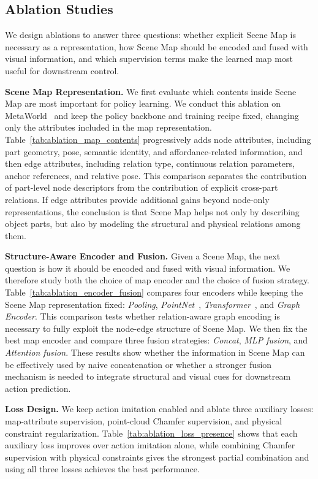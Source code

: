\subsection{Ablation Studies}
\label{sec:ablation_studies}





We design ablations to answer three questions: whether explicit Scene Map is necessary as a representation, how Scene Map should be encoded and fused with visual information, and which supervision terms make the learned map most useful for downstream control.

\textbf{Scene Map Representation.}
We first evaluate which contents inside Scene Map are most important for policy learning. We conduct this ablation on MetaWorld~\cite{Yu2020Meta,mclean2025metaworld} and keep the policy backbone and training recipe fixed, changing only the attributes included in the map representation. Table~\ref{tab:ablation_map_contents} progressively adds node attributes, including part geometry, pose, semantic identity, and affordance-related information, and then edge attributes, including relation type, continuous relation parameters, anchor references, and relative pose. This comparison separates the contribution of part-level node descriptors from the contribution of explicit cross-part relations. If edge attributes provide additional gains beyond node-only representations, the conclusion is that Scene Map helps not only by describing object parts, but also by modeling the structural and physical relations among them.



\textbf{Structure-Aware Encoder and Fusion.}
Given a Scene Map, the next question is how it should be encoded and fused with visual information. We therefore study both the choice of map encoder and the choice of fusion strategy. Table~\ref{tab:ablation_encoder_fusion} compares four encoders while keeping the Scene Map representation fixed: \textit{Pooling}, \textit{PointNet}~\cite{Qi2017PointNet}, \textit{Transformer}~\cite{Kim2021Transformer}, and \textit{Graph Encoder}. This comparison tests whether relation-aware graph encoding is necessary to fully exploit the node-edge structure of Scene Map. We then fix the best map encoder and compare three fusion strategies: \textit{Concat}, \textit{MLP fusion}, and \textit{Attention fusion}. These results show whether the information in Scene Map can be effectively used by naive concatenation or whether a stronger fusion mechanism is needed to integrate structural and visual cues for downstream action prediction.

\textbf{Loss Design.}
We keep action imitation enabled and ablate three auxiliary losses: map-attribute supervision, point-cloud Chamfer supervision, and physical constraint regularization. Table~\ref{tab:ablation_loss_presence} shows that each auxiliary loss improves over action imitation alone, while combining Chamfer supervision with physical constraints gives the strongest partial combination and using all three losses achieves the best performance.

